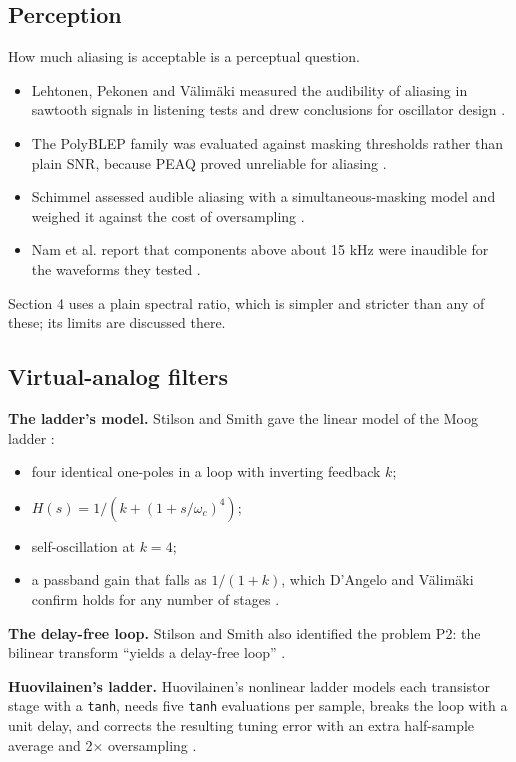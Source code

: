 \documentclass[conference]{IEEEtran}
\begin{document}
\setcounter{subsection}{4}
\subsection{Perception}
How much aliasing is acceptable is a perceptual question.

\begin{itemize}
\item Lehtonen, Pekonen and Välimäki measured the audibility of aliasing in sawtooth signals in listening tests and drew conclusions for oscillator design \cite{r22}.
\item The PolyBLEP family was evaluated against masking thresholds rather than plain SNR, because PEAQ proved unreliable for aliasing \cite{r40}.
\item Schimmel assessed audible aliasing with a simultaneous-masking model and weighed it against the cost of oversampling \cite{r28}.
\item Nam et al. report that components above about 15 kHz were inaudible for the waveforms they tested \cite{r23}.
\end{itemize}

Section 4 uses a plain spectral ratio, which is simpler and stricter than any of these; its limits are discussed there.

\setcounter{subsection}{5}
\subsection{Virtual-analog filters}
\textbf{The ladder's model.} Stilson and Smith gave the linear model of the Moog ladder \cite{r33}:

\begin{itemize}
\item four identical one-poles in a loop with inverting feedback $k$;
\item $H(s) = 1/(k + (1 + s/\omega_c)^4)$;
\item self-oscillation at $k = 4$;
\item a passband gain that falls as $1/(1+k)$, which D'Angelo and Välimäki confirm holds for any number of stages \cite{r6}.
\end{itemize}

\textbf{The delay-free loop.} Stilson and Smith also identified the problem P2: the bilinear transform ``yields a delay-free loop'' \cite{r33}.

\textbf{Huovilainen's ladder.} Huovilainen's nonlinear ladder models each transistor stage with a \texttt{tanh}, needs five \texttt{tanh} evaluations per sample, breaks the loop with a unit delay, and corrects the resulting tuning error with an extra half-sample average and 2× oversampling \cite{r17}.
\end{document}
